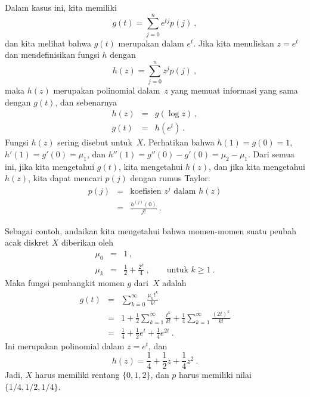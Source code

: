 Dalam kasus ini, kita memiliki
$$
g(t) = \sum_{j = 0}^n e^{tj} p(j)\ ,
$$
dan kita melihat bahwa $g(t)$ merupakan  dalam $e^t$.  Jika kita menuliskan $z =
e^t$ dan mendefinisikan fungsi $h$ dengan
$$
h(z) = \sum_{j = 0}^n z^j p(j)\ ,
$$
maka $h(z)$ merupakan polinomial dalam~$z$ yang memuat informasi yang sama dengan $g(t)$,
dan sebenarnya
\begin{eqnarray*}
h(z) &=& g(\log z)\ , \\
g(t) &=& h(e^t)\ .
\end{eqnarray*}
Fungsi $h(z)$ sering disebut  untuk~$X$.  Perhatikan bahwa $h(1) = g(0) =
1$,
$h'(1) = g'(0) =
\mu_1$, dan
$h''(1) = g''(0) - g'(0) = \mu_2 - \mu_1$.  Dari semua ini, jika kita mengetahui
$g(t)$, kita mengetahui $h(z)$, dan jika kita mengetahui $h(z)$, kita dapat mencari $p(j)$
dengan rumus Taylor:
\begin{eqnarray*}
p(j) &=& \mbox{koefisien}\,\, z^j \,\, \mbox{dalam}\,\, h(z) \\
     &=& \frac{h^{(j)}(0)}{j!}\ .
\end{eqnarray*}

Sebagai contoh, andaikan kita mengetahui bahwa momen-momen suatu peubah acak
diskret $X$ diberikan oleh
\begin{eqnarray*}
\mu_0 &=& 1\ , \\
\mu_k &=& \frac12 + \frac{2^k}4\ , \qquad \mbox{untuk}\,\, k \geq 1\ .
\end{eqnarray*}
Maka fungsi pembangkit momen $g$ dari~$X$ adalah
\begin{eqnarray*}
g(t) &=& \sum_{k = 0}^\infty \frac{\mu_k t^k}{k!} \\
     &=& 1 + \frac12 \sum_{k = 1}^\infty \frac{t^k}{k!} + \frac14 \sum_{k =
1}^\infty \frac{(2t)^k}{k!} \\
     &=& \frac14 + \frac12 e^t + \frac14 e^{2t}\ .
\end{eqnarray*}
Ini merupakan polinomial dalam $z = e^t$, dan
$$
h(z) = \frac14 + \frac12 z + \frac14 z^2\ .
$$
Jadi, $X$ harus memiliki rentang $\{0,1,2\}$, dan $p$ harus memiliki nilai
$\{1/4,1/2,1/4\}$.

